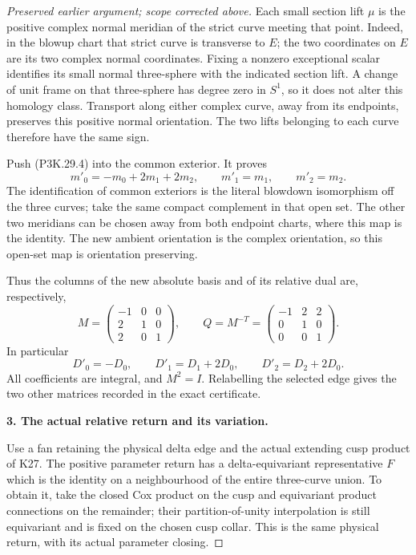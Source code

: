 \begin{proof}[Preserved earlier argument; scope corrected above]
Each small section lift \(\mu\) is the positive complex normal
meridian of the strict curve meeting that point. Indeed, in the
blowup chart that strict curve is transverse to \(E\); the two
coordinates on \(E\) are its two complex normal coordinates.
Fixing a nonzero exceptional scalar identifies its small normal
three-sphere with the indicated section lift. A change of unit
frame on that three-sphere has degree zero in \(S^1\), so it
does not alter this homology class. Transport along either
complex curve, away from its endpoints, preserves this positive
normal orientation. The two lifts belonging to each curve
therefore have the same sign.

Push (P3K.29.4) into the common exterior. It proves
\[
        m'_0=-m_0+2m_1+2m_2,\qquad
        m'_1=m_1,\qquad m'_2=m_2.                        \tag{P3K.29.5}
\]
The identification of common exteriors is the literal blowdown
isomorphism off the three curves; take the same compact
complement in that open set. The other two meridians can be
chosen away from both endpoint charts, where this map is the
identity. The new ambient orientation is the complex orientation,
so this open-set map is orientation preserving.

Thus the columns of the new absolute basis and of its relative
dual are, respectively,
\[
 M=
 \begin{pmatrix}-1&0&0\\2&1&0\\2&0&1\end{pmatrix},
 \qquad
 Q=M^{-T}=
 \begin{pmatrix}-1&2&2\\0&1&0\\0&0&1\end{pmatrix}.
                                                        \tag{P3K.29.6}
\]
In particular
\[
              D'_0=-D_0,\qquad
              D'_1=D_1+2D_0,\qquad
              D'_2=D_2+2D_0.                           \tag{P3K.29.7}
\]
All coefficients are integral, and \(M^2=I\). Relabelling
the selected edge gives the two other matrices recorded in
the exact certificate.

\par\medskip\noindent\textbf{3. The actual relative return and its variation.}\enspace

Use a fan retaining the physical delta edge and the actual
extending cusp product of K27. The positive parameter return
has a delta-equivariant representative \(F\) which is the
identity on a neighbourhood of the entire three-curve union.
To obtain it, take the closed Cox product on the cusp and
equivariant product connections on the remainder; their
partition-of-unity interpolation is still equivariant and is
fixed on the chosen cusp collar. This is the same physical
return, with its actual parameter closing.


\end{proof}
